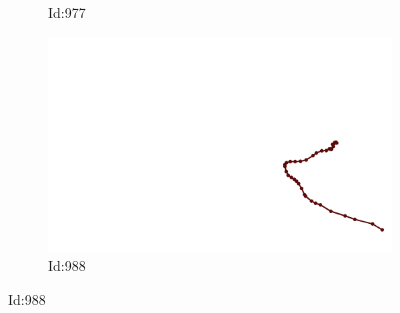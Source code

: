 \documentclass[12pt,twoside]{report}
\begin{document}
\begin{figure}
\begin{subfigure}[b]{0.20\textwidth}
\caption{Id:977}
\end{subfigure}
\begin{subfigure}[b]{0.20\textwidth}
\centering
\includegraphics[width=\textwidth]{../trajectories/988.png}
\caption{Id:988}
\end{subfigure}
\end{figure}
\end{document}
